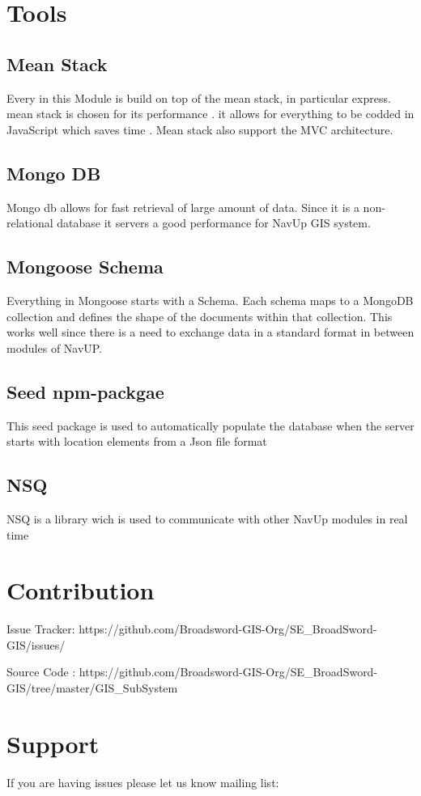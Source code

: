 \documentclass{article}
\begin{document}
\section{Tools}
	\subsection{Mean Stack}
		Every in this Module is build on top of the mean stack, in particular express. mean stack is chosen for its performance 
		. it allows for everything to be codded in JavaScript which saves time . Mean stack also support the MVC architecture.
	\subsection{Mongo DB}
		Mongo db allows for fast retrieval of large amount of data. Since it is a non-relational database it servers a good 				performance for NavUp GIS system.
	\subsection{Mongoose Schema}
		Everything in Mongoose starts with a Schema. Each schema maps to a MongoDB collection and defines the shape of the 		documents within that collection. 
		This works well since there is a need to exchange data in a standard format in between modules of NavUP.
	\subsection{Seed npm-packgae}
		This seed package is used to automatically populate the database when the server starts with location elements from a Json file format
	\subsection{NSQ}
		NSQ is a library wich is used to communicate with other NavUp modules in real time
		
\section{Contribution}
	\item Issue Tracker: https://github.com/Broadsword-GIS-Org/SE_BroadSword-GIS/issues/
	\item Source Code : https://github.com/Broadsword-GIS-Org/SE_BroadSword-GIS/tree/master/GIS_SubSystem
	
\section{Support}
	\item If you are having issues please let us know
		mailing list: 
\end{document}
